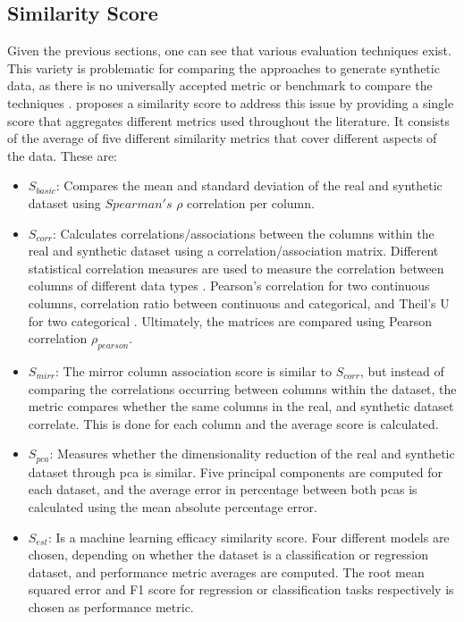 \subsection{Similarity Score}
\label{ch:preliminaries-similarityScore}
Given the previous sections, one can see that various evaluation techniques exist.
This variety is problematic for comparing the approaches to generate synthetic data, as there is no universally accepted metric or benchmark to compare the techniques \cite{hernandez2022SyntheticDataGeneration, chundawat2022UniversalMetricRobust}.
\textcite{brenninkmeijer2019GenerationEvaluationTabular} proposes a similarity score to address this issue by providing a single score that aggregates different metrics used throughout the literature. 
It consists of the average of five different similarity metrics that cover different aspects of the data. These are:
\begin{itemize}
  \item $S_{basic}$: Compares the mean and standard deviation of the real and synthetic dataset using $Spearman's$ $\rho$ \cite{lane2003IntroductionStatistics} correlation per column.
  \item $S_{corr}$: Calculates correlations/associations between the columns within the real and synthetic dataset using a correlation/association matrix. 
  Different statistical correlation measures are used to measure the correlation between columns of different data types \cite[p. 37]{brenninkmeijer2019GenerationEvaluationTabular}.
  Pearson's correlation for two continuous columns, correlation ratio between continuous and categorical, and Theil's U for two categorical \cite{brenninkmeijer2019GenerationEvaluationTabular, lane2003IntroductionStatistics}.  
  Ultimately, the matrices are compared using Pearson correlation $\rho_{pearson}$.
  \item $S_{mirr}$: The mirror column association score is similar to $S_{corr}$, but instead of comparing the correlations occurring between columns within the dataset,
  the metric compares whether the same columns in the real, and synthetic dataset correlate.
  This is done for each column and the average score is calculated.
  \item $S_{pca}$: Measures whether the dimensionality reduction of the real and synthetic dataset through \gls{pca} is similar.
  Five principal components are computed for each dataset, and the average error in percentage between both \glspl{pca} is calculated using the mean absolute percentage error.
  \item $S_{est}$: Is a machine learning efficacy similarity score. Four different models are chosen, depending on whether the dataset is a classification or regression dataset, and performance metric averages are computed.
  The root mean squared error and F1 score for regression or classification tasks respectively is chosen as performance metric.
\end{itemize}


